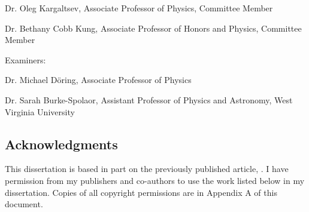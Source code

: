 \documentclass[12pt]{article}
\begin{document}

\indent Dr. Oleg Kargaltsev, Associate Professor of Physics, Committee Member
\vspace{12pt}

\indent Dr. Bethany Cobb Kung, Associate Professor of Honors and Physics, Committee Member
\vspace{24pt}

\noindent Examiners:

\vspace{12pt}
\indent Dr. Michael D\"oring, Associate Professor of Physics

\vspace{12pt}

\indent Dr. Sarah Burke-Spolaor, Assistant Professor of Physics and Astronomy, West Virginia University




\doublespacing
\newpage
{} \label{acknowledgements}
\begin{center}
\section*{Acknowledgments}
\end{center}
\vspace*{6pt}
\doublespacing
This dissertation is based in part on the previously published article, \citet{2022A&C....4000629C}. I have permission from my publishers and co-authors to use the work listed below in my dissertation. Copies of all copyright permissions are in Appendix A of this document. 
\end{document}
